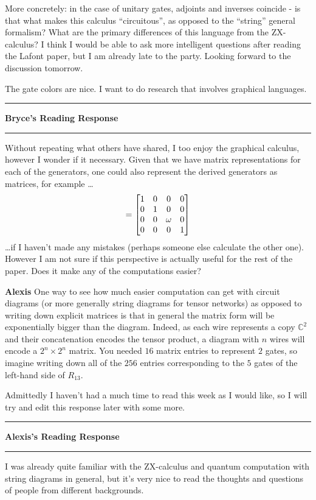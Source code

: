 \documentclass{amsart}
\newcommand{\iam}[1]{
  \vspace{0.25em}
  \hrule
  \vspace{0.25em}
  \textbf{{#1}'s Reading Response}
  \vspace{0.25em}
  \hrule
  \vspace{1em}
}
\newcommand{\respond}[1]{
  \vspace{1em} \textbf{#1}
}
\newcommand{\tikzfig}[1]{
\InputIfFileExists{#1}{}{}
}
\begin{document}
More concretely: in the case of unitary gates, adjoints and inverses coincide - is that what makes this calculus ``circuitous'', as opposed to the ``string'' general formalism? What are the primary differences of this language from the ZX-calculus? I think I would be able to ask more intelligent questions after reading the Lafont paper, but I am already late to the party. Looking forward to the discussion tomorrow.

The gate colors are nice. I want to do research that involves graphical languages.

\iam{Bryce}

Without repeating what others have shared, I too enjoy the graphical calculus, however I wonder if it necessary.
Given that we have matrix representations for each of the generators, one could also represent the derived generators as matrices, for example \ldots
\[
  \tikzfig{paper1-U} =
    \begin{bmatrix}
        1 & 0 & 0 & 0 \\
        0 & 1 & 0 & 0 \\
        0 & 0 & \omega & 0 \\
        0 & 0 & 0 & 1
     \end{bmatrix}
\]
\ldots if I haven't made any mistakes (perhaps someone else calculate the other one). However I am not sure if this perspective is actually useful for the rest of the paper. Does it make any of the computations easier?

\respond{Alexis} One way to see how much easier computation can get with circuit diagrams (or more generally string diagrams for tensor networks) as opposed to writing down explicit matrices is that in general the matrix form will be exponentially bigger than the diagram. Indeed, as each wire represents a copy $\mathbb{C}^2$ and their concatenation encodes the tensor product, a diagram with $n$ wires will encode a $2^n \times 2^n$ matrix.
You needed $16$ matrix entries to represent $2$ gates, so imagine writing down all of the $256$ entries corresponding to the $5$ gates of the left-hand side of $R_{13}$.
\linebreak

 Admittedly I haven't had a much time to read this week as I would like, so I will try and edit this response later with some more.


 \iam{Alexis}

 I was already quite familiar with the ZX-calculus and quantum computation with string diagrams in general, but it's very nice to read the thoughts and questions of people from different backgrounds.
\end{document}
